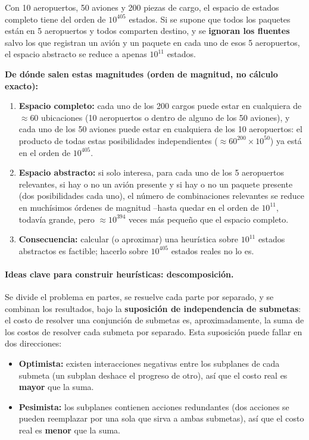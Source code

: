 \begin{example}
Con 10 aeropuertos, 50 aviones y 200 piezas de cargo, el espacio de estados completo tiene del orden
de $10^{405}$ estados. Si se supone que todos los paquetes están en 5 aeropuertos y todos comparten
destino, y se \textbf{ignoran los fluentes} salvo los que registran un avión y un paquete en cada uno
de esos 5 aeropuertos, el espacio abstracto se reduce a apenas $10^{11}$ estados.

\textbf{De dónde salen estas magnitudes (orden de magnitud, no cálculo exacto):}
\begin{enumerate}
    \item \textbf{Espacio completo:} cada uno de los 200 cargos puede estar en cualquiera de
    $\approx 60$ ubicaciones (10 aeropuertos o dentro de alguno de los 50 aviones), y cada uno de
    los 50 aviones puede estar en cualquiera de los 10 aeropuertos: el producto de todas estas
    posibilidades independientes ($\approx 60^{200}\times 10^{50}$) ya está en el orden de
    $10^{405}$.
    \item \textbf{Espacio abstracto:} si solo interesa, para cada uno de los 5 aeropuertos
    relevantes, si hay o no un avión presente y si hay o no un paquete presente (dos posibilidades
    cada uno), el número de combinaciones relevantes se reduce en muchísimos órdenes de magnitud
    --hasta quedar en el orden de $10^{11}$, todavía grande, pero $\approx 10^{394}$ veces más
    pequeño que el espacio completo.
    \item \textbf{Consecuencia:} calcular (o aproximar) una heurística sobre $10^{11}$ estados
    abstractos es factible; hacerlo sobre $10^{405}$ estados reales no lo es.
\end{enumerate}
\end{example}

\paragraph{Ideas clave para construir heurísticas: descomposición.} Se divide el problema en partes,
se resuelve cada parte por separado, y se combinan los resultados, bajo la \textbf{suposición de
independencia de submetas}: el costo de resolver una conjunción de submetas es, aproximadamente, la
suma de los costos de resolver cada submeta por separado. Esta suposición puede fallar en dos
direcciones:
\begin{itemize}
    \item \textbf{Optimista:} existen interacciones negativas entre los subplanes de cada submeta
    (un subplan deshace el progreso de otro), así que el costo real es \textbf{mayor} que la suma.
    \item \textbf{Pesimista:} los subplanes contienen acciones redundantes (dos acciones se pueden
    reemplazar por una sola que sirva a ambas submetas), así que el costo real es \textbf{menor} que
    la suma.
\end{itemize}

